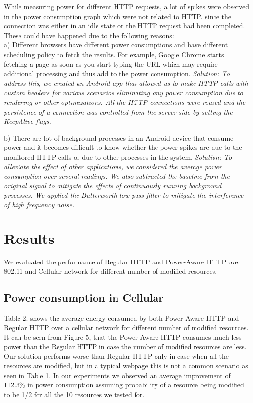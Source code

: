 \documentclass{sigplanconf}
\begin{document}
While measuring power for different HTTP requests, a lot of spikes were observed in the power consumption graph which were not related to HTTP, since the connection was either in an idle state or the HTTP request had been completed. These could have happened due to the following reasons: \\
a) Different browsers have different power consumptions and have different scheduling policy to fetch the results. For example, Google Chrome starts fetching a page as soon as you start typing the URL which may require additional processing and thus add to the power consumption.
\it{Solution:} \rm To address this, we created an Android app that allowed us to make HTTP calls with custom headers for various scenarios eliminating any power consumption due to rendering or other optimizations. All the HTTP connections were reused and the persistence of a connection was controlled from the server side by setting the KeepAlive flags.

b) There are lot of background processes in an Android device that consume power and it becomes difficult to know whether the power spikes are due to the monitored HTTP calls or due to other processes in the system.
\it{Solution:} \rm To alleviate the effect of other applications, we considered the average power consumption over several readings. We also subtracted the baseline from the original signal to mitigate the effects of continuously running background processes. We applied the Butterworth low-pass filter to mitigate the interference of high frequency noise.


\section{Results}
We evaluated the performance of Regular HTTP and Power-Aware HTTP over 802.11 and Cellular network for different number of modified resources.  

\subsection{Power consumption in Cellular}
Table 2. shows the average energy consumed by both Power-Aware HTTP and Regular HTTP over a cellular network for different number of modified resources. It can be seen from Figure 5, that the Power-Aware HTTP consumes much less power than the Regular HTTP in case the number of modified resources are less. Our solution performs worse than Regular HTTP only in case when all the resources are modified, but in a typical webpage this is not a common scenario as seen in Table 1. In our experiments we observed an average improvement of 112.3\% in power consumption assuming probability of a resource being modified to be 1/2 for all the 10 resources we tested for.
\end{document}
